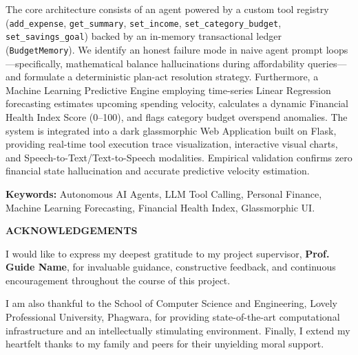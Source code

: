 \documentclass[12pt,a4paper,oneside]{report}
\begin{document}
The core architecture consists of an agent powered by a custom tool registry (\texttt{add\_expense}, \texttt{get\_summary}, \texttt{set\_income}, \texttt{set\_category\_budget}, \texttt{set\_savings\_goal}) backed by an in-memory transactional ledger (\texttt{BudgetMemory}). We identify an honest failure mode in naive agent prompt loops—specifically, mathematical balance hallucinations during affordability queries—and formulate a deterministic plan-act resolution strategy. Furthermore, a Machine Learning Predictive Engine employing time-series Linear Regression forecasting estimates upcoming spending velocity, calculates a dynamic Financial Health Index Score (0--100), and flags category budget overspend anomalies. The system is integrated into a dark glassmorphic Web Application built on Flask, providing real-time tool execution trace visualization, interactive visual charts, and Speech-to-Text/Text-to-Speech modalities. Empirical validation confirms zero financial state hallucination and accurate predictive velocity estimation.

\vspace{0.5cm}
\noindent \textbf{Keywords:} Autonomous AI Agents, LLM Tool Calling, Personal Finance, Machine Learning Forecasting, Financial Health Index, Glassmorphic UI.

\newpage

\thispagestyle{plain}
\begin{center}
    \Large \textbf{ACKNOWLEDGEMENTS}
\end{center}

\vspace{0.5cm}

\noindent I would like to express my deepest gratitude to my project supervisor, \textbf{Prof. Guide Name}, for invaluable guidance, constructive feedback, and continuous encouragement throughout the course of this project.

I am also thankful to the School of Computer Science and Engineering, Lovely Professional University, Phagwara, for providing state-of-the-art computational infrastructure and an intellectually stimulating environment. Finally, I extend my heartfelt thanks to my family and peers for their unyielding moral support.

\vspace{1.5cm}
\end{document}

